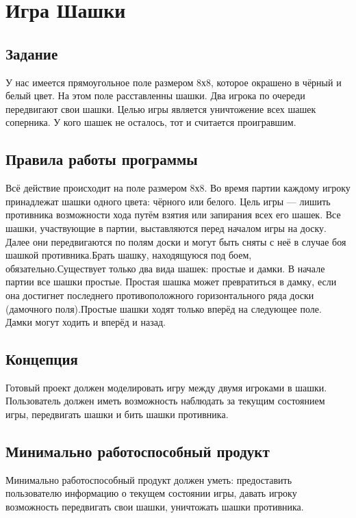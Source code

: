 \documentclass[a4paper]{article}
\begin{document}
\vfill %
\tableofcontents
\newpage

\section{Игра Шашки}
\subsection{Задание}
У нас имеется прямоугольное поле размером 8х8, которое окрашено в чёрный и белый цвет. На этом поле расставленны шашки. Два игрока по очереди передвигают свои шашки. Целью игры является уничтожение всех шашек соперника. У кого шашек не осталось, тот и считается проигравшим.

\subsection{Правила работы программы}
Всё действие происходит на поле размером 8х8. Во время партии каждому игроку принадлежат шашки одного цвета: чёрного или белого. Цель игры — лишить противника возможности хода путём взятия или запирания всех его шашек. Все шашки, участвующие в партии, выставляются перед началом игры на доску. Далее они передвигаются по полям доски и могут быть сняты с неё в случае боя шашкой противника.Брать шашку, находящуюся под боем, обязательно.Существует только два вида шашек: простые и дамки. В начале партии все шашки простые. Простая шашка может превратиться в дамку, если она достигнет последнего противоположного горизонтального ряда доски (дамочного поля).Простые шашки ходят только вперёд на следующее поле. Дамки могут ходить и вперёд и назад.

\subsection{Концепция}
Готовый проект должен моделировать игру между двумя игроками в шашки. Пользователь должен иметь возможность наблюдать за текущим состоянием игры, передвигать шашки и бить шашки противника. 

\subsection{Минимально работоспособный продукт}
Минимально работоспособный продукт должен уметь: предоставить пользователю информацию о текущем состоянии игры, давать игроку возможность передвигать свои шашки, уничтожать шашки противника.
\end{document}
